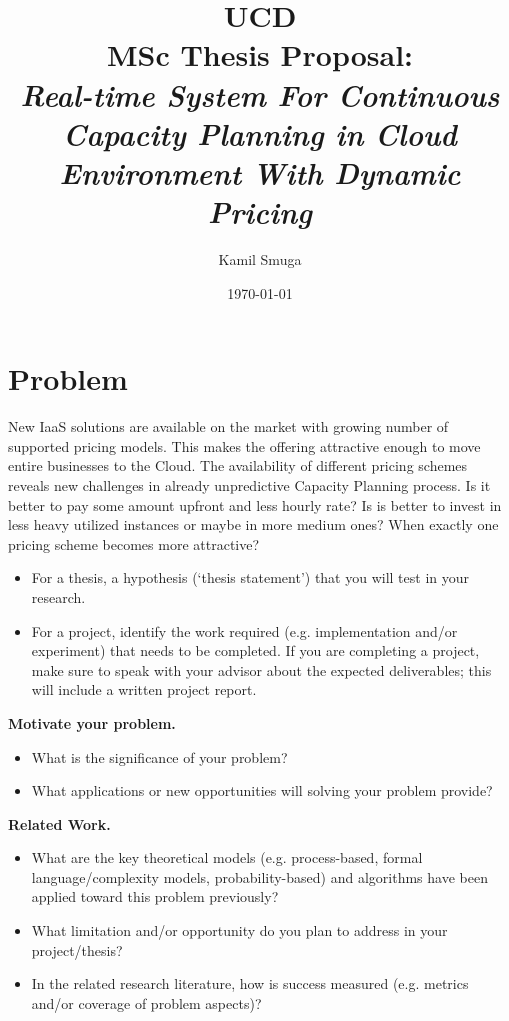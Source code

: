 \documentclass[11pt]{artikel3}
\title{UCD
\\MSc Thesis Proposal:\\\emph{Real-time System For Continuous Capacity Planning in Cloud Environment With Dynamic Pricing}}
\author{Kamil Smuga}
\date{\today}
\begin{document}
\maketitle


\section{Problem}

New IaaS solutions are available on the market with growing number of supported pricing models. This makes the offering attractive enough to move entire businesses to the Cloud. The availability of different pricing schemes reveals new challenges in already unpredictive Capacity Planning process. Is it better to pay some amount upfront and less hourly rate? Is is better to invest in less heavy utilized instances or maybe in more medium ones? When exactly one pricing scheme becomes more attractive? 

\begin{itemize}
  \item For a thesis, a hypothesis (`thesis statement') that you will test in your research.
  \item For a project, identify the work required (e.g. implementation and/or experiment) that needs to be completed. If you are completing a project, make sure to speak with your advisor about the expected deliverables; this will include a written project report.
\end{itemize}


{\bf Motivate your problem.} 
\begin{itemize}
  \item What is the significance of your problem? 
  \item What applications or new opportunities will solving your problem provide?
\end{itemize}


{\bf Related Work.}
\begin{itemize}
  \item What are the key theoretical models (e.g. process-based, formal language/complexity models, probability-based) and algorithms have been applied toward this problem previously? 
  \item What limitation and/or opportunity do you plan to address in your project/thesis?
  \item
In the related research literature, how is success measured (e.g. metrics and/or coverage of problem aspects)?
\end{itemize}
\end{document}
